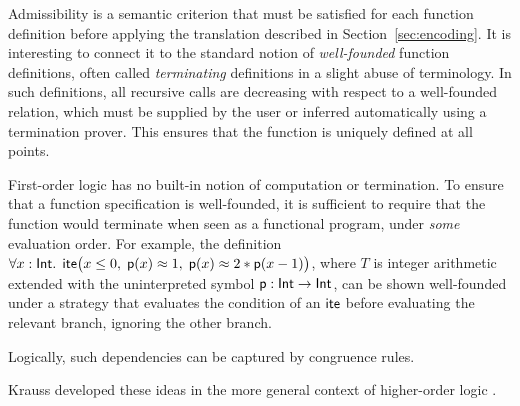 Admissibility is a semantic criterion that must be satisfied for each function
definition before applying the translation described in
Section~\ref{sec:encoding}. It is interesting to connect it to the
standard notion of \emph{well-founded} function definitions, often called
\emph{terminating} definitions in a slight abuse of terminology. In such
definitions, all recursive calls are decreasing with respect to a well-founded
relation, which must be supplied by the user or inferred automatically
using a termination prover. This ensures that the function is uniquely defined
at all points.

First-order logic has no built-in notion of computation or termination. To ensure
that a function specification is well-founded, it is sufficient to require that
the function would terminate when seen as a functional program, under \emph{some}
evaluation order. For example, the definition
$\forall x : {\mathsf{Int}}.\;\, \mathsf{ite}\bigl(
x \leq 0,\allowbreak\; \mathsf{p}( x ) \approx 1,\allowbreak\; \mathsf{p}( x ) \approx 2 * \mathsf{p}( x - 1 ) \bigr)$,
where $T$ is integer arithmetic extended with the uninterpreted symbol 
$\mathsf{p}:\mathsf{Int} \rightarrow \mathsf{Int}$, can be shown well-founded under a strategy that
evaluates the condition of an $\mathsf{ite}$ before evaluating the relevant branch,
ignoring the other branch. \begin{longv}Logically, such dependencies can be captured by
congruence rules. \end{longv}Krauss developed these ideas in the more general context of
higher-order logic \cite[Section 2]{krauss-2009-phd}.

